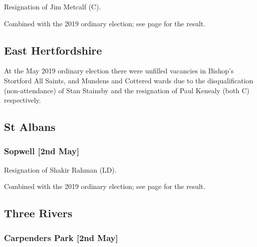 \documentclass[a4paper,openany]{book}
\begin{document}
\begin{resultsiii}

Resignation of Jim Metcalf (C).

Combined with the 2019 ordinary election; see page \pageref{BroxbourneBroxbourneHoddesdonSouth} for the result.

\subsection*{East Hertfordshire}

At the May 2019 ordinary election there were unfilled vacancies in Bishop's Stortford All Saints, and Mundens and Cottered wards due to the disqualification (non-attendance) of Stan Stainsby and the resignation of Paul Kenealy (both C) respectively.

\subsection*{St Albans}

\subsubsection*{Sopwell \hspace*{\fill}\nolinebreak[1]%
	\enspace\hspace*{\fill}
	[2nd May]}


Resignation of Shakir Rahman (LD).

Combined with the 2019 ordinary election; see page \pageref{SopwellSaintAlbans} for the result.

\subsection*{Three Rivers}

\subsubsection*{Carpenders Park \hspace*{\fill}\nolinebreak[1]%
	\enspace\hspace*{\fill}
	[2nd May]}


\end{resultsiii}
\end{document}
